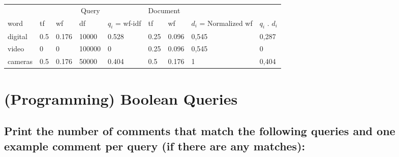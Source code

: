 \documentclass{scrartcl}
\begin{document}
\begin{table}[]
\centering
\begin{tabular}{lllllllll}
                             & \multicolumn{4}{c}{Query}         & \multicolumn{3}{l}{Document}    &             \\ \cline{2-8}
word                         & tf & wf  & df  & $q_i$ = wf-idf & tf & wf  & $d_i$ = Normalized wf & $q_i$ . $d_i$ \\ \hline
\multicolumn{1}{l|}{digital} & 0.5  & 0.176   & 10000  & 0.528             & 0.25  & 0.096   &         0,545           &      0,287       \\
\multicolumn{1}{l|}{video}   & 0  & 0   & 100000 & 0             & 0.25  & 0.096   &          0,545            &       0      \\
\multicolumn{1}{l|}{cameras} & 0.5  & 0.176 & 50000  & 0.404           & 0.5  & 0.176 &        1              &     0,404      
\end{tabular}
\end{table}


\section{(Programming) Boolean Queries
}

\subsection{Print the number of comments that match the following queries and one example comment
	per query (if there are any matches):}
\end{document}
